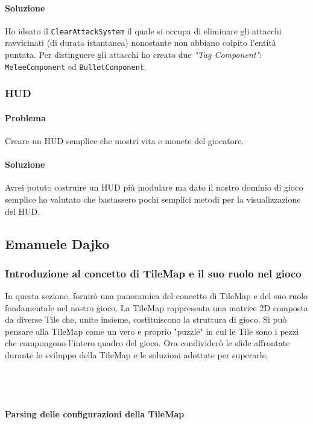 \documentclass[a4paper,12pt]{report}
\begin{document}
\paragraph{Soluzione}
Ho ideato il \texttt{ClearAttackSystem} il quale si occupa di eliminare gli attacchi
ravvicinati (di durata istantanea) nonostante non abbiano colpito l'entità puntata.
Per distinguere gli attacchi ho creato due \textit{"Tag Component"}: \texttt{MeleeComponent}
ed \texttt{BulletComponent}.

\subsubsection{HUD}

\paragraph{Problema}
Creare un HUD semplice che mostri vita e monete del giocatore.
\paragraph{Soluzione}
Avrei potuto costruire un HUD più modulare ma dato il nostro dominio di 
gioco semplice ho valutato che bastassero pochi semplici metodi per la 
visualizzazione del HUD. 

\subsection{Emanuele Dajko}
\subsubsection*{Introduzione al concetto di TileMap e il suo ruolo nel gioco}
In questa sezione, fornirò una panoramica del concetto di TileMap e del suo ruolo fondamentale nel nostro gioco. 
La TileMap rappresenta una matrice 2D composta da diverse Tile che, unite insieme, costituiscono la struttura di gioco. 
Si può pensare alla TileMap come un vero e proprio "puzzle" in cui le Tile sono i pezzi che compongono l'intero quadro del gioco. 
Ora condividerò le sfide affrontate durante lo sviluppo della TileMap e le soluzioni adottate per superarle.
\\\\\\\
\paragraph*{Parsing delle configurazioni della TileMap}
\end{document}
